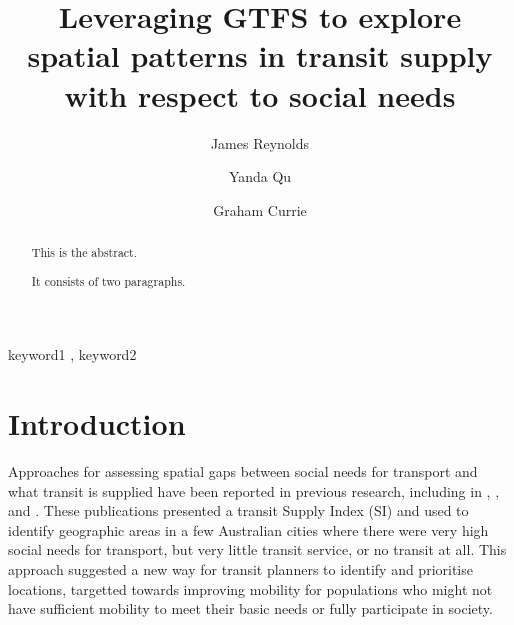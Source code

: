 \documentclass[preprint, 3p,
authoryear]{elsarticle} %
\begin{document}
\begin{frontmatter}

  \title{Leveraging GTFS to explore spatial patterns in transit supply
with respect to social needs}
    \author[Public Transport Research Group (PTRG)]{James Reynolds%
  }
    \author[Public Transport Research Group (PTRG)]{Yanda Qu%
  }
    \author[Public Transport Research Group (PTRG)]{Graham Currie%
  }
  
  \begin{abstract}
  This is the abstract.

  It consists of two paragraphs.
  \end{abstract}
    \begin{keyword}
    keyword1 \sep 
    keyword2
  \end{keyword}
  
 \end{frontmatter}

\section{Introduction}\label{introduction}

Approaches for assessing spatial gaps between social needs for transport
and what transit is supplied have been reported in previous research,
including in \citet{Currie2003Hobart}, \citet{Currie2004Gap},
\citet{Currie2007Identifying} and \citet{currie2010identifying}. These
publications presented a transit Supply Index (SI) and used to identify
geographic areas in a few Australian cities where there were very high
social needs for transport, but very little transit service, or no
transit at all. This approach suggested a new way for transit planners
to identify and prioritise locations, targetted towards improving
mobility for populations who might not have sufficient mobility to meet
their basic needs or fully participate in society.
\end{document}
